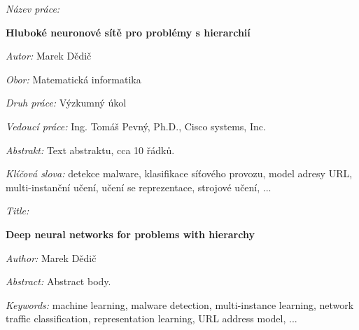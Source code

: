 \begin{czech}
	\begin{onehalfspace}
		\noindent \textit{Název práce:}

		\noindent \textbf{Hluboké neuronové sítě pro problémy s hierarchií}
	\end{onehalfspace}

	\bigskip

	\noindent \textit{Autor:} Marek Dědič

	\bigskip

	\noindent \textit{Obor:} Matematická informatika

	\bigskip

	\noindent \textit{Druh práce:} Výzkumný úkol

	\bigskip

	\noindent \textit{Vedoucí práce:} Ing. Tomáš Pevný, Ph.D., Cisco systems, Inc.

	\bigskip

	\noindent \textit{Abstrakt:}
	Text abstraktu, cca 10 řádků.

	\bigskip

	\noindent \textit{Klíčová slova:}
	detekce malware, klasifikace síťového provozu, model adresy URL, multi-instanční učení, učení se reprezentace, strojové učení, ...
\end{czech}

\vfill

\begin{onehalfspace}
	\noindent \textit{Title:}

	\noindent \textbf{Deep neural networks for problems with hierarchy}
\end{onehalfspace}

\bigskip

\noindent \textit{Author:} Marek Dědič

\bigskip

\noindent \textit{Abstract:}
Abstract body.

\bigskip

\noindent \textit{Keywords:}
machine learning, malware detection, multi-instance learning, network traffic classification, representation learning, URL address model, ...
